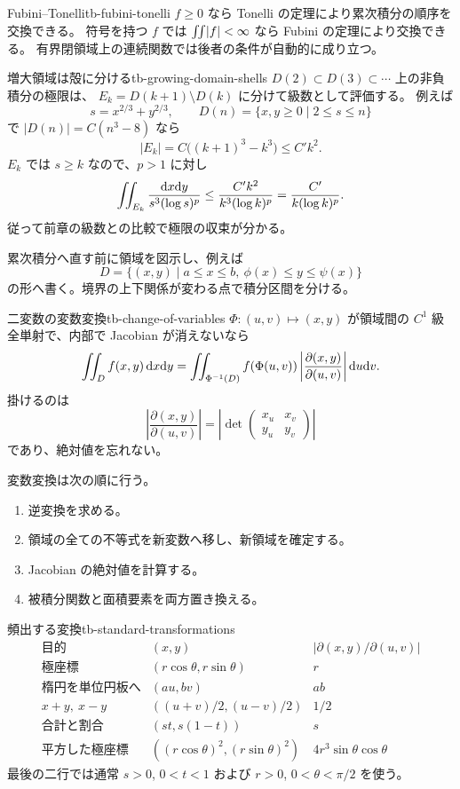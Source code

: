 \begin{theorem}{Fubini--Tonelli}{tb-fubini-tonelli}
$f\ge0$ なら Tonelli の定理により累次積分の順序を交換できる。
符号を持つ $f$ では $\iint\lvert f \rvert<\infty$ なら Fubini の定理により交換できる。
有界閉領域上の連続関数では後者の条件が自動的に成り立つ。
\end{theorem}

\begin{proposition}{増大領域は殻に分ける}{tb-growing-domain-shells}
$D(2)\subset D(3)\subset\cdots$ 上の非負積分の極限は、
$E_k=D(k+1)\setminus D(k)$ に分けて級数として評価する。
例えば
\[
s=x^{2/3}+y^{2/3},\qquad
D(n)=\{x,y\ge0\mid2\le s\le n\}
\]
で $|D(n)|=C(n^3-8)$ なら
\[
|E_k|=C\bigl((k+1)^3-k^3\bigr)\le C'k^2.
\]
$E_k$ では $s\ge k$ なので、$p>1$ に対し
\[
\iint_{E_k}\frac{\mathrm{d} x\mathrm{d} y}{s^3(\log s)^p}
\le\frac{C'k^2}{k^3(\log k)^p}
=\frac{C'}{k(\log k)^p}.
\]
従って前章の級数との比較で極限の収束が分かる。
\end{proposition}

累次積分へ直す前に領域を図示し、例えば
\[
D=\{(x,y)\mid a\le x\le b,\ \phi(x)\le y\le\psi(x)\}
\]
の形へ書く。境界の上下関係が変わる点で積分区間を分ける。

\begin{theorem}{二変数の変数変換}{tb-change-of-variables}
$\Phi:(u,v)\mapsto(x,y)$ が領域間の $C^1$ 級全単射で、内部で Jacobian が消えないなら
\[
\iint_D f(x,y)\,\mathrm{d} x\mathrm{d} y
=\iint_{\Phi^{-1}(D)}f(\Phi(u,v))
\left|\frac{\partial(x,y)}{\partial(u,v)}\right|\mathrm{d} u\mathrm{d} v.
\]
掛けるのは
\[
\left|\frac{\partial(x,y)}{\partial(u,v)}\right|
=\left|\det
\begin{pmatrix}x_u&x_v\\y_u&y_v\end{pmatrix}\right|
\]
であり、絶対値を忘れない。
\end{theorem}

変数変換は次の順に行う。
\begin{enumerate}
  \item 逆変換を求める。
  \item 領域の全ての不等式を新変数へ移し、新領域を確定する。
  \item Jacobian の絶対値を計算する。
  \item 被積分関数と面積要素を両方置き換える。
\end{enumerate}

\begin{proposition}{頻出する変換}{tb-standard-transformations}
\[
\begin{array}{c|c|c}
\text{目的}&(x,y)&\left|\partial(x,y)/\partial(u,v)\right|\\ \hline
\text{極座標}&(r\cos\theta,r\sin\theta)&r\\
\text{楕円を単位円板へ}&(au,bv)&ab\\
x+y,\ x-y&( (u+v)/2,(u-v)/2)&1/2\\
\text{合計と割合}&(st,s(1-t))&s\\
\text{平方した極座標}&((r\cos\theta)^2,(r\sin\theta)^2)&4r^3\sin\theta\cos\theta
\end{array}
\]
最後の二行では通常 $s>0$, $0<t<1$ および $r>0$, $0<\theta<\pi/2$ を使う。
\end{proposition}


